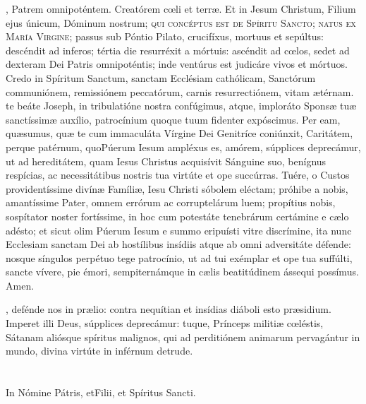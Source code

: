 \documentclass[10pt,a4paper,oneside]{book}
\begin{document}
\begin{minipage}[t]{0.475\textwidth}
    , Patrem omnipoténtem. Creatórem c{\oe}li et terr{\ae}. Et in Jesum Christum, Filium ejus únicum, Dóminum nostrum;
    \textsc{qui concéptus est de Spíritu Sancto; natus ex María Virgine}; passus sub Póntio Pilato, crucifíxus, mortuus et sepúltus:
    descéndit ad inferos; tértia die resurréxit a mórtuis: ascéndit ad c{\oe}los, sedet ad dexteram Dei Patris omnipoténtis;
    inde ventúrus est judicáre vivos et mórtuos. Credo in Spíritum Sanctum, sanctam Ecclésiam cathólicam, Sanctórum communiónem,
    remissiónem peccatórum, carnis resurrectiónem, vitam {\ae}térnam. \\

     te beáte Joseph, in tribulatióne nostra confúgimus, atque, imploráto Spons{\ae} tu{\ae} sanctíssim{\ae} auxílio, patrocínium 
    quoque tuum fidenter expóscimus. Per eam, qu{\ae}sumus, qu{\ae} te cum immaculáta Vírgine Dei Genitríce coniúnxit, Caritátem, perque patérnum, 
    quoPúerum Iesum ampléxus es, amórem, súpplices deprecámur, ut ad hereditátem, quam Iesus Christus acquisívit Sánguine suo, benígnus respícias, 
    ac necessitátibus nostris tua virtúte et ope succúrras. Tuére, o Custos providentíssime divín{\ae} Famíli{\ae}, Iesu Christi sóbolem eléctam; próhibe a nobis, 
    amantíssime Pater, omnem errórum ac corruptelárum luem; propítius nobis, sospítator noster fortíssime, in hoc cum potestáte tenebrárum certámine e 
    c{\ae}lo adésto; et sicut olim Púerum Iesum e summo eripuísti vitre discrímine, ita nunc Ecclesiam sanctam Dei ab hostílibus insídiis atque ab omni 
    adversitáte défende: nosque síngulos perpétuo tege patrocínio, ut ad tui exémplar et ope tua suffúlti, sancte vívere, pie émori, sempiternámque in 
    c{\ae}lis beatitúdinem ássequi possímus. Amen.\\

    \hspace{4.5mm}

    , defénde nos in pr{\ae}lio: contra nequítian et insídias diáboli esto pr{\ae}sidium. Imperet illi Deus, 
    súpplices deprecámur: tuque, Prínceps militi{\ae} c{\oe}léstis, Sátanam aliósque spíritus malignos, qui ad perditiónem animarum pervagántur in mundo,
    divina virtúte in inférnum detrude. \\

    \\

    \\

    In Nómine Pátris, et{\redcross}Filii, et Spíritus Sancti.
\end{minipage}
\end{document}
